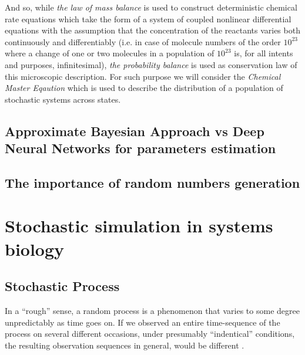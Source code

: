 \documentclass[12pt,a4paper]{report}
\begin{document}
And so, while \emph{the law of mass balance} is used to construct deterministic chemical rate equations which take the form of a system of coupled nonlinear differential equations with the assumption that the concentration of the reactants varies both continuously and differentiably (i.e. in case of molecule numbers of the order $10^{23}$ where a change of one or two molecules in a population of $10^{23}$ is, for all intents and purposes, infinitesimal), \emph{the probability balance} is used as conservation law of this microscopic description. For such purpose we will consider the \emph{Chemical Master Eqaution} which is used to describe the distribution of a population of stochastic systems across states.


\section{Approximate Bayesian Approach vs Deep Neural Networks for parameters estimation}

\section{The importance of random numbers generation}

\chapter{Stochastic simulation in systems biology}\label{Simulations}

\section{Stochastic Process}
In a ``rough'' sense, a random process is a phenomenon that varies to some degree unpredictably as time goes on. If we observed an entire time-sequence of the process on several different occasions, under presumably ``indentical'' conditions, the resulting observation sequences in general, would be different \cite{AssocProfThamer}. 
\end{document}
